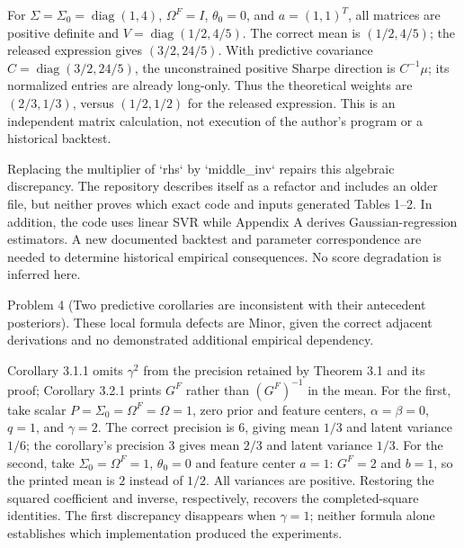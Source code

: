 \documentclass[10pt]{article}
\begin{document}
For \(\Sigma=\Sigma_0=\operatorname{diag}(1,4)\), \(\Omega^F=I\), \(\theta_0=0\), and \(a=(1,1)^T\), all matrices are positive definite and \(V=\operatorname{diag}(1/2,4/5)\). The correct mean is \((1/2,4/5)\); the released expression gives \((3/2,24/5)\). With predictive covariance \(C=\operatorname{diag}(3/2,24/5)\), the unconstrained positive Sharpe direction is \(C^{-1}\mu\); its normalized entries are already long-only. Thus the theoretical weights are \((2/3,1/3)\), versus \((1/2,1/2)\) for the released expression. This is an independent matrix calculation, not execution of the author’s program or a historical backtest.\par
Replacing the multiplier of `rhs` by `middle\_inv` repairs this algebraic discrepancy. The repository describes itself as a refactor and includes an older file, but neither proves which exact code and inputs generated Tables 1–2. In addition, the code uses linear SVR while Appendix A derives Gaussian-regression estimators. A new documented backtest and parameter correspondence are needed to determine historical empirical consequences. No score degradation is inferred here.\par
Problem 4 (Two predictive corollaries are inconsistent with their antecedent posteriors).  These local formula defects are Minor, given the correct adjacent derivations and no demonstrated additional empirical dependency.\par
Corollary 3.1.1 omits \(\gamma^2\) from the precision retained by Theorem 3.1 and its proof; Corollary 3.2.1 prints \(G^F\) rather than \((G^F)^{-1}\) in the mean. For the first, take scalar \(P=\Sigma_0=\Omega^F=\Omega=1\), zero prior and feature centers, \(\alpha=\beta=0\), \(q=1\), and \(\gamma=2\). The correct precision is \(6\), giving mean \(1/3\) and latent variance \(1/6\); the corollary’s precision \(3\) gives mean \(2/3\) and latent variance \(1/3\). For the second, take \(\Sigma_0=\Omega^F=1\), \(\theta_0=0\) and feature center \(a=1\): \(G^F=2\) and \(b=1\), so the printed mean is \(2\) instead of \(1/2\). All variances are positive. Restoring the squared coefficient and inverse, respectively, recovers the completed-square identities. The first discrepancy disappears when \(\gamma=1\); neither formula alone establishes which implementation produced the experiments.\par
\end{document}

